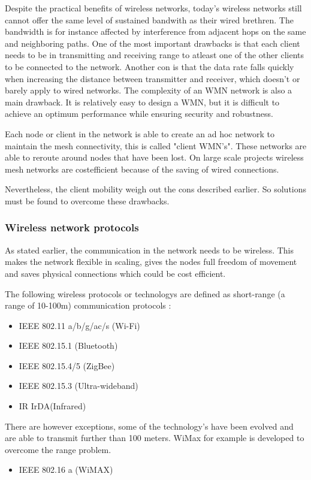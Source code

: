 \documentclass[10pt,a4paper]{article}
\begin{document}
Despite the practical benefits of wireless networks, today's wireless networks still cannot offer the same level of sustained bandwith as their wired brethren. The bandwidth is for instance affected by interference from adjacent hops on the same and neighboring paths. \cite{architectureandalgorithmsmultichannelwirelessmeshnetwork} One of the most important drawbacks is that each client needs to be in transmitting and receiving range to atleast one of the other clients to be connected to the network. \cite{wirelessmeshnetworksopportunitiesandchallenges} Another con is that the data rate falls quickly when increasing the distance between transmitter and receiver, which doesn't or barely apply to wired networks. \cite{architectureandalgorithmsmultichannelwirelessmeshnetwork} The complexity of an WMN network is also a main drawback. It is relatively easy to design a WMN, but it is difficult to achieve an optimum performance while ensuring security and robustness.\cite{wirelessmeshnetworksopportunitiesandchallenges} 

Each node or client in the network is able to create an ad hoc network to maintain the mesh connectivity, this is called "client WMN's". These networks are able to reroute around nodes that have been lost. On large scale projects wireless mesh networks are costefficient because of the saving of wired connections.\cite{meshnetworking} 

Nevertheless, the client mobility weigh out the cons described earlier. So solutions must be found to overcome these drawbacks.

\newpage
\subsubsection{Wireless network protocols}
As stated earlier, the communication in the network needs to be wireless. This makes the network flexible in scaling, gives the nodes full freedom of movement and saves physical connections which could be cost efficient.

The following wireless protocols or technologys are defined as short-range (a range of 10-100m) communication protocols \cite{emergingstandarsforwirelessmeshtechnology} \cite{combook}:
\begin{itemize}
\setlength\itemsep{0em}
    \item IEEE 802.11 a/b/g/ac/s (Wi-Fi) \cite{IEEE80211timeline}
    \item IEEE 802.15.1 (Bluetooth)
    \item IEEE 802.15.4/5 (ZigBee)
    \item IEEE 802.15.3 (Ultra-wideband)
    \item IR IrDA(Infrared)
\end{itemize}
 There are however exceptions, some of the technology's have been evolved and are able to transmit further than 100 meters. WiMax for example is developed to overcome the range problem. 
\begin{itemize}
\setlength\itemsep{0em}
     \item IEEE 802.16 a (WiMAX)
\end{itemize}
\end{document}
